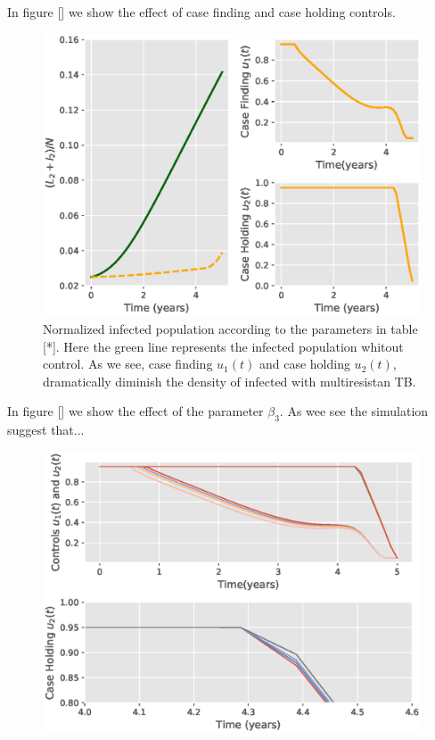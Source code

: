 In figure [] we show the effect of case finding and case holding controls.

\begin{figure}
  \centering
  \includegraphics[width=0.7\linewidth]{Figures/figure_1_two_strain_tbm}
  \caption{Normalized infected population according to the parameters in 
  table [*]. Here the green line represents the infected population whitout 
  control. As we see, case finding $u_1(t)$ and case holding $u_2(t)$, 
  dramatically diminish the density of infected with multiresistan TB.}
  \label{fig:figure1twostraintbm}
\end{figure}


In figure [] we show the effect of the parameter $\beta_3$. As wee see the 
simulation suggest that...

\begin{figure}
  \centering
  \includegraphics[width=0.7\linewidth]{Figures/figure_2_two_strain_tbm}
  \caption{}
  \label{fig:figure2twostraintbm}
\end{figure}

